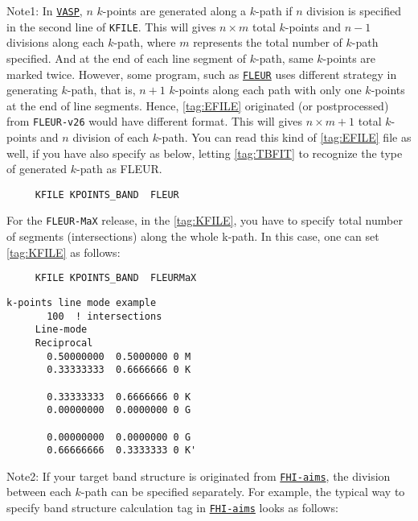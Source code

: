 \documentclass[a4paper,12pt]{scrartcl}
\begin{document}
\begin{description}
    Note1: In \href{https://www.vasp.at}{\texttt{VASP}}, $n$ $k$-points are generated along a $k$-path if $n$ 
    division is specified in the second line of \texttt{KFILE}. This will gives $n \times m$ total $k$-points and $n-1$ divisions along each $k$-path, where $m$ represents the total number of $k$-path specified. And at the end of each line segment of $k$-path, same $k$-points are marked twice. 
    However, some program, 
    such as \href{http://www.flapw.de}{\texttt{FLEUR}} uses different strategy 
    in generating $k$-path, that is, 
    $n+1$ $k$-points along each path with only one $k$-points at the end
    of line segments. Hence, \ref{tag:EFILE} originated (or postprocessed) 
    from \texttt{FLEUR-v26} would have different format.
    This will gives $n \times m + 1$ total $k$-points and $n$ division of 
    each $k$-path. You can read this kind of \ref{tag:EFILE} file as well, if you have 
    also specify as below, letting \ref{tag:TBFIT} to recognize the type of 
    generated $k$-path as FLEUR.
    
     \begin{verbatim}
     KFILE KPOINTS_BAND  FLEUR
     \end{verbatim}
    
    For the \texttt{FLEUR-MaX} release, in the \ref{tag:KFILE}, you have to specify total number of segments (intersections) along the whole k-path. In this case, one can set \ref{tag:KFILE} as follows:
    
     \begin{verbatim}
     KFILE KPOINTS_BAND  FLEURMaX
     \end{verbatim}
         \begin{Verbatim}[commandchars=\\\{\},gobble=4, frame=single, framesep=2mm, 
            label= KPOINTS\_BAND $line$ $mode$ example with FLEURMaX tag, 
            labelposition=bottomline]
     k-points line mode example
       100  ! intersections
     Line-mode
     Reciprocal
       0.50000000  0.5000000 0 M
       0.33333333  0.6666666 0 K
       
       0.33333333  0.6666666 0 K
       0.00000000  0.0000000 0 G
       
       0.00000000  0.0000000 0 G
       0.66666666  0.3333333 0 K'
        \end{Verbatim}

    
        Note2: If your target band structure is originated from \href{https://aimsclub.fhi-berlin.mpg.de}{\texttt{FHI-aims}}, 
        the division between each $k$-path can be specified separately. For example, the typical way to specify band structure calculation tag
        in \href{https://aimsclub.fhi-berlin.mpg.de}{\texttt{FHI-aims}} looks as follows:
        

\end{description}
\end{document}
